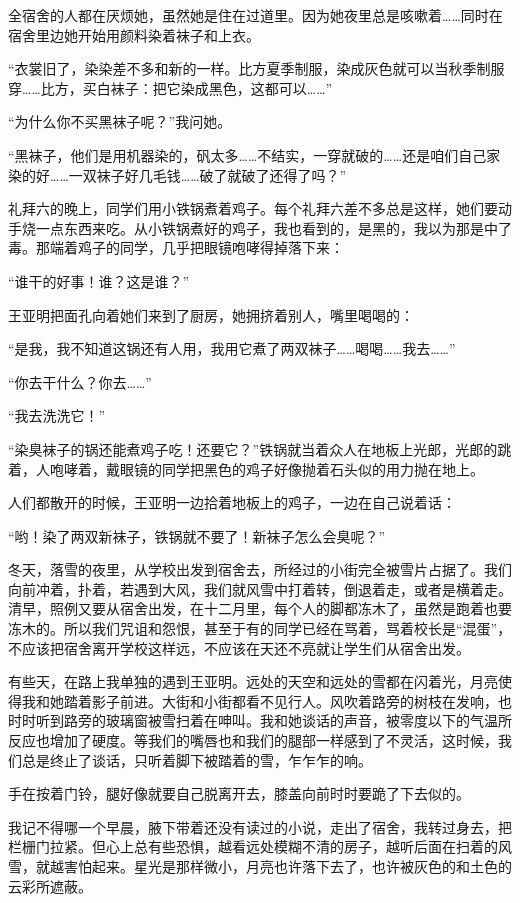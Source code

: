 \par 全宿舍的人都在厌烦她，虽然她是住在过道里。因为她夜里总是咳嗽着……同时在宿舍里边她开始用颜料染着袜子和上衣。
\par “衣裳旧了，染染差不多和新的一样。比方夏季制服，染成灰色就可以当秋季制服穿……比方，买白袜子：把它染成黑色，这都可以……”
\par “为什么你不买黑袜子呢？”我问她。
\par “黑袜子，他们是用机器染的，矾太多……不结实，一穿就破的……还是咱们自己家染的好……一双袜子好几毛钱……破了就破了还得了吗？”
\par 礼拜六的晚上，同学们用小铁锅煮着鸡子。每个礼拜六差不多总是这样，她们要动手烧一点东西来吃。从小铁锅煮好的鸡子，我也看到的，是黑的，我以为那是中了毒。那端着鸡子的同学，几乎把眼镜咆哮得掉落下来：
\par “谁干的好事！谁？这是谁？”
\par 王亚明把面孔向着她们来到了厨房，她拥挤着别人，嘴里喝喝的：
\par “是我，我不知道这锅还有人用，我用它煮了两双袜子……喝喝……我去……”
\par “你去干什么？你去……”
\par “我去洗洗它！”
\par “染臭袜子的锅还能煮鸡子吃！还要它？”铁锅就当着众人在地板上光郎，光郎的跳着，人咆哮着，戴眼镜的同学把黑色的鸡子好像抛着石头似的用力抛在地上。
\par 人们都散开的时候，王亚明一边拾着地板上的鸡子，一边在自己说着话：
\par “哟！染了两双新袜子，铁锅就不要了！新袜子怎么会臭呢？”
\par 冬天，落雪的夜里，从学校出发到宿舍去，所经过的小街完全被雪片占据了。我们向前冲着，扑着，若遇到大风，我们就风雪中打着转，倒退着走，或者是横着走。清早，照例又要从宿舍出发，在十二月里，每个人的脚都冻木了，虽然是跑着也要冻木的。所以我们咒诅和怨恨，甚至于有的同学已经在骂着，骂着校长是“混蛋”，不应该把宿舍离开学校这样远，不应该在天还不亮就让学生们从宿舍出发。
\par 有些天，在路上我单独的遇到王亚明。远处的天空和远处的雪都在闪着光，月亮使得我和她踏着影子前进。大街和小街都看不见行人。风吹着路旁的树枝在发响，也时时听到路旁的玻璃窗被雪扫着在呻叫。我和她谈话的声音，被零度以下的气温所反应也增加了硬度。等我们的嘴唇也和我们的腿部一样感到了不灵活，这时候，我们总是终止了谈话，只听着脚下被踏着的雪，乍乍乍的响。
\par 手在按着门铃，腿好像就要自己脱离开去，膝盖向前时时要跪了下去似的。
\par 我记不得哪一个早晨，腋下带着还没有读过的小说，走出了宿舍，我转过身去，把栏栅门拉紧。但心上总有些恐惧，越看远处模糊不清的房子，越听后面在扫着的风雪，就越害怕起来。星光是那样微小，月亮也许落下去了，也许被灰色的和土色的云彩所遮蔽。
